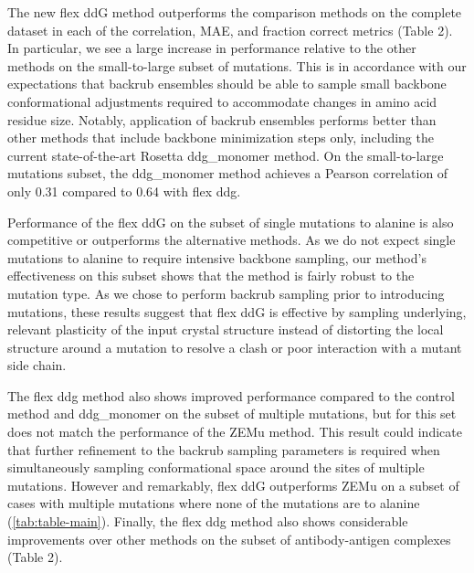 The new flex ddG method outperforms the comparison methods on the complete dataset in each of the correlation, MAE, and fraction correct metrics (Table 2). In particular, we see a large increase in performance relative to the other methods on the small-to-large subset of mutations. This is in accordance with our expectations that backrub ensembles should be able to sample small backbone conformational adjustments required to accommodate changes in amino acid residue size. Notably, application of backrub ensembles performs better than other methods that include backbone minimization steps only, including the current state-of-the-art Rosetta ddg\_monomer method. On the small-to-large mutations subset, the ddg\_monomer method achieves a Pearson correlation of only 0.31 compared to 0.64 with flex ddg.

Performance of the flex ddG on the subset of single mutations to alanine is also competitive or outperforms the alternative methods.
As we do not expect single mutations to alanine to require intensive backbone sampling, our method's effectiveness on this subset shows that the method is fairly robust to the mutation type.
As we chose to perform backrub sampling prior to introducing mutations, these results suggest that flex ddG is effective by sampling underlying, relevant plasticity of the input crystal structure instead of distorting the local structure around a mutation to resolve a clash or poor interaction with a mutant side chain.

The flex ddg method also shows improved performance compared to the control method and ddg\_monomer on the subset of multiple mutations, but for this set does not match the performance of the ZEMu method.
This result could indicate that further refinement to the backrub sampling parameters is required when simultaneously sampling conformational space around the sites of multiple mutations.
However and remarkably, flex ddG outperforms ZEMu on a subset of cases with multiple mutations where none of the mutations are to alanine (\cref{tab:table-main}). Finally, the flex ddg method also shows considerable improvements over other methods on the subset of antibody-antigen complexes (Table 2).

